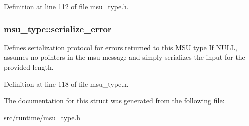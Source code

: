 Definition at line 112 of file msu\-\_\-type.\-h.

\hypertarget{structmsu__type_a765dacf40ac27344e2411e1c4e77a5a9}{
\subsubsection[{serialize\-\_\-error}]{ msu\-\_\-type\-::serialize\-\_\-error}}\label{structmsu__type_a765dacf40ac27344e2411e1c4e77a5a9}


Defines serialization protocol for errors returned to this M\-S\-U type If N\-U\-L\-L, assumes no pointers in the msu message and simply serializes the input for the provided length. 



Definition at line 118 of file msu\-\_\-type.\-h.



The documentation for this struct was generated from the following file\-:\begin{DoxyCompactItemize}
\item 
src/runtime/\hyperlink{msu__type_8h}{msu\-\_\-type.\-h}\end{DoxyCompactItemize}
